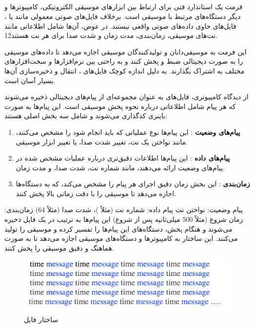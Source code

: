 \subsection{}


فرمت   \cite{de2017understanding} یک استاندارد فنی برای ارتباط بین ابزارهای موسیقی الکترونیکی، کامپیوترها و دیگر دستگاه‌های مرتبط با موسیقی است. برخلاف فایل‌های صوتی معمولی مانند  یا ، فایل‌های  حاوی داده‌های صوتی واقعی نیستند. در عوض، آن‌ها شامل اطلاعاتی مانند نت‌های موسیقی، زمان‌بندی، مدت زمان و شدت صدا برای هر نت هستند12.

این فرمت به موسیقی‌دانان و تولیدکنندگان موسیقی اجازه می‌دهد تا داده‌های موسیقی را به صورت دیجیتالی ضبط و پخش کنند و به راحتی بین نرم‌افزارها و سخت‌افزارهای مختلف به اشتراک بگذارند. به دلیل اندازه کوچک فایل‌های ، انتقال و ذخیره‌سازی آن‌ها بسیار آسان است.

از دیدگاه کامپیوتری، فایل‌های  به عنوان مجموعه‌ای از پیام‌های دیجیتالی ذخیره می‌شوند که هر پیام شامل اطلاعاتی درباره نحوه پخش موسیقی است. این پیام‌ها به صورت باینری کدگذاری می‌شوند و شامل سه بخش اصلی هستند:

\begin{enumerate}
  \def\labelenumi{\arabic{enumi}.}
  \item
    \textbf{پیام‌های وضعیت }: این پیام‌ها نوع عملیاتی که
    باید انجام شود را مشخص می‌کنند، مانند نواختن یک نت، تغییر شدت صدا، یا
    تغییر ابزار موسیقی.
  \item
    \textbf{پیام‌های داده }: این پیام‌ها اطلاعات دقیق‌تری
    درباره عملیات مشخص شده در پیام‌های وضعیت ارائه می‌دهند، مانند شماره نت،
    شدت صدا، و مدت زمان.
  \item
    \textbf{زمان‌بندی }: این بخش زمان دقیق اجرای هر پیام را مشخص
    می‌کند، که به دستگاه‌ها اجازه می‌دهد تا موسیقی را با دقت زمانی بالا پخش
    کنند.
  \end{enumerate}

پیام وضعیت: نواختن نت 
پیام داده: شماره نت (مثلاً )، شدت صدا (مثلاً 64)
زمان‌بندی: زمان شروع (مثلاً 500 میلی‌ثانیه پس از شروع)
این پیام‌ها به ترتیب در یک فایل  ذخیره می‌شوند و هنگام پخش، دستگاه‌های  این پیام‌ها را تفسیر کرده و موسیقی را تولید می‌کنند. این ساختار به کامپیوترها و دستگاه‌های موسیقی اجازه می‌دهد تا به صورت هماهنگ و دقیق موسیقی را پخش کنند.

\begin{figure}[!htb]
  \centering
  \includegraphics[scale=1]{Figures/Screenshot 2024-08-29 021655.png}
  \caption{ساختار فایل 
  }
  \label{Fig:MIDI}
\end{figure}

